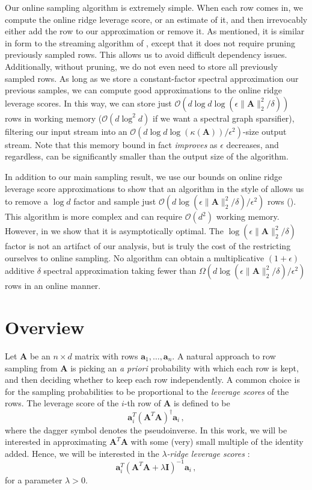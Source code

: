 \documentclass{toc}
\newcommand{\Oh}{\ensuremath{\mathcal{O}}}
\newcommand{\bv}[1]{\mathbf{#1}}
\newcommand{\norm}[1]{\|#1\|}
\begin{document}
Our online sampling algorithm is extremely simple. When each row comes in, we compute the online ridge leverage score, or an estimate of it, and then irrevocably either add the row to our approximation or remove it. As mentioned, it is similar in form to the streaming algorithm of \cite{kelner2013spectral}, except that it does not require pruning previously sampled rows.
This allows us to avoid difficult dependency issues. Additionally, without pruning, we do not even need to store all previously sampled rows. As long as we store a constant-factor spectral approximation our previous samples, we can compute good approximations to the online ridge leverage scores. In this way, we can store just $\Oh(d \log d \log (\epsilon \norm{\bv A}_2^2/\delta) )$ rows in working memory ($\Oh(d\log^2 d)$ if we want a spectral graph sparsifier), filtering our input stream into an $\Oh(d \log d \log (\kappa(\bv A)) / \epsilon^2)$-size output stream. Note that this memory bound in fact \emph{improves} as $\epsilon$ decreases, and regardless, can be significantly smaller than the output size of the algorithm.

In addition to our main sampling result, we use our bounds on online ridge leverage score approximations to show that an algorithm in the style of \cite{batson2012twice} allows us to remove a $\log d$ factor and sample just $\Oh(d \log (\epsilon\norm{\bv A}_2^2/\delta) / \epsilon^2)$ rows ().
This algorithm is more complex and can require $\Oh(d^2)$ working memory. However, in  we show that it is asymptotically optimal. The $\log (\epsilon\norm{\bv A}_2^2/\delta)$ factor is not an artifact of our analysis, but is truly the cost of the restricting ourselves to online sampling. No algorithm can obtain a multiplicative $(1+\epsilon)$ additive $\delta$ spectral approximation taking fewer than $\Omega(d \log (\epsilon\norm{\bv A}_2^2/\delta) / \epsilon^2)$ rows in an online manner.

\section{Overview}
\label{sec:overview}
Let $\bv{A}$ be an $n \times d$ matrix with rows $\bv{a}_1, \ldots, \bv{a}_n$.
A natural approach to row sampling from $\bv A$ is picking an \emph{a priori} probability with which each row is kept,
and then deciding whether to keep each row independently.
A common choice is for the sampling probabilities to be proportional to the \emph{leverage scores} of the rows.
The leverage score of the $i$-th row of $\bv{A}$ is defined to be
$$
    \bv{a}_i^T (\bv{A}^T\bv{A})^{\dagger} \bv{a}_i\,,
$$
where the dagger symbol denotes the pseudoinverse.
In this work, we will be interested in approximating $\bv{A}^T\bv{A}$ with some (very) small multiple of the identity added.
Hence, we will be interested in the \emph{$\lambda$-ridge leverage scores} \cite{alaoui2014fast}:
$$
    \bv{a}_i^T (\bv{A}^T\bv{A} + \lambda \bv{I})^{-1} \bv{a}_i\,,
$$
for a parameter $\lambda > 0$.
\end{document}
